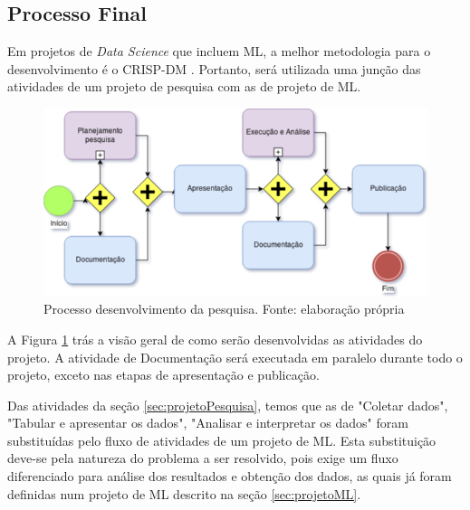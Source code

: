 \subsection{Processo Final}

Em projetos de \textit{Data Science} que incluem ML, a melhor metodologia para o desenvolvimento é o CRISP-DM \cite{CROWSTON2017}.
Portanto, será utilizada uma junção das atividades de um projeto de pesquisa com as de projeto de ML.

\begin{figure}[h]
	\centering
    \includegraphics[keepaspectratio=true,scale=0.5]{figuras/processoPrincipal}
	\caption[Processo desenvolvimento da pesquisa]{Processo desenvolvimento da pesquisa. Fonte: elaboração própria}
	\label{fig:processoPrincipal}
\end{figure}

A Figura \ref{fig:processoPrincipal} trás a visão geral de como serão desenvolvidas as atividades do projeto. A atividade de Documentação será executada em paralelo durante todo o projeto, exceto nas etapas de apresentação e publicação.

Das atividades da seção \ref{sec:projetoPesquisa}, temos que as de "Coletar dados", "Tabular e apresentar os dados", "Analisar e interpretar os dados" foram substituídas pelo fluxo de atividades de um projeto de ML. Esta substituição deve-se pela natureza do problema a ser resolvido, pois exige um fluxo diferenciado para análise dos resultados e obtenção dos dados, as quais já foram definidas num projeto de ML descrito na seção \ref{sec:projetoML}.

